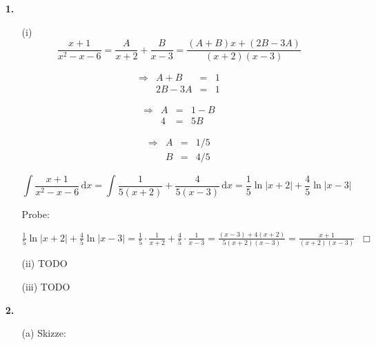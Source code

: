 \documentclass[a4paper,11pt,fleqn]{scrartcl}
\author{\authorinfo}
\title{\titleinfo}
\date{\today}
\newcommand{\dX}[1]{\, \mathrm{d}#1}
\newcommand{\dx}[0]{\dX{x}}
\begin{document}
\maketitle
\begin{enumerate}
    \item[\textbf{1.}]
        \begin{enumerate}
            \item[(i)]
                \[ \frac{x+1}{x^2-x-6} = \frac{A}{x+2} + \frac{B}{x-3} = \frac{(A+B)x + (2B - 3A)}{(x+2)(x-3)} \]
                \begin{multicols}{3}
                    \[\begin{array}{lrcl}
                        \Rightarrow & A + B &=& 1\\
                        & 2B - 3A &=& 1
                    \end{array}\]

                    \[\begin{array}{lrcl}
                        \Rightarrow & A &=& 1 - B\\
                        & 4 &=& 5B
                    \end{array}\]

                    \[\begin{array}{lrcl}
                        \Rightarrow & A &=& 1 / 5\\
                        & B &=& 4 / 5
                    \end{array}\]
                \end{multicols}

                \[ \int \frac{x+1}{x^2-x-6} \dx = \int \frac{1}{5(x+2)} + \frac{4}{5(x-3)} \dx = \frac{1}{5} \ln |x+2| + \frac{4}{5} \ln |x-3| \]

                Probe:

                \( \frac{1}{5} \ln |x+2| + \frac{4}{5} \ln |x-3| = \frac{1}{5} \cdot \frac{1}{x+2} + \frac{4}{5} \cdot \frac{1}{x-3} = \frac{(x-3)+4(x+2)}{5(x+2)(x-3)} = \frac{x + 1}{(x+2)(x-3)} \;\;\Box \)

            \item[(ii)]
                TODO

            \item[(iii)]
                TODO
        \end{enumerate}
    \item[\textbf{2.}]
        \begin{enumerate}
            \item[(a)]
                Skizze:


\end{enumerate}
\end{enumerate}
\end{document}
